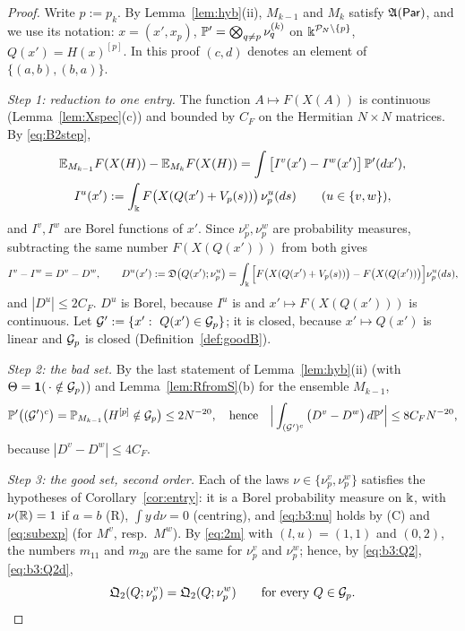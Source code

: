 \begin{proof}
Write $p:=p_k$. By Lemma~\ref{lem:hyb}(ii), $M_{k-1}$ and $M_k$ satisfy $\fA(\Par)$, and we use its notation: $x=(x',x_p)$, $\P'=\bigotimes_{q\ne p}\nu^{(k)}_q$ on $\K^{\mathcal P_N\setminus\{p\}}$, $Q(x')=H(x)^{[p]}$.
In this proof $(c,d)$ denotes an element of $\{(a,b),(b,a)\}$.

\smallskip\noindent\emph{Step 1: reduction to one entry.} The function $A\mapsto F(X(A))$ is continuous (Lemma~\ref{lem:Xspec}(c)) and bounded by $C_F$ on the Hermitian $N\times N$ matrices. By \eqref{eq:B2step},
\begin{gather*}
\E_{M_{k-1}}F(X(H))-\E_{M_k}F(X(H))=\int\big[I^v(x')-I^w(x')\big]\,\P'(dx'),\\
I^u(x'):=\int_\K F\big(X(Q(x')+V_p(s))\big)\,\nu^u_p(ds)\qquad(u\in\{v,w\}),
\end{gather*}
and $I^v,I^w$ are Borel functions of $x'$. Since $\nu^v_p,\nu^w_p$ are probability measures, subtracting the same number $F(X(Q(x')))$ from both gives
\begin{equation}\label{eq:b3:DD}
I^v-I^w=D^v-D^w,\qquad D^u(x'):=\mathfrak D\big(Q(x');\nu^u_p\big)=\int_\K\Big[F\big(X(Q(x')+V_p(s))\big)-F\big(X(Q(x'))\big)\Big]\nu^u_p(ds),
\end{equation}
and $|D^u|\le2C_F$.
$D^u$ is Borel, because $I^u$ is and $x'\mapsto F(X(Q(x')))$ is continuous. Let $\cG':=\{x':\ Q(x')\in\cG_p\}$; it is closed, because $x'\mapsto Q(x')$ is linear and $\cG_p$ is closed (Definition~\ref{def:goodB}).

\smallskip\noindent\emph{Step 2: the bad set.} By the last statement of Lemma~\ref{lem:hyb}(ii) (with $\Theta=\mathbf 1(\,\cdot\notin\cG_p)$) and Lemma~\ref{lem:RfromS}(b) for the ensemble $M_{k-1}$,
\begin{equation}\label{eq:b3:bad}
\P'\big((\cG')^c\big)=\P_{M_{k-1}}\big(H^{[p]}\notin\cG_p\big)\le2N^{-20},\quad\text{hence}\quad\Big|\int_{(\cG')^c}\big(D^v-D^w\big)\,d\P'\Big|\le8C_FN^{-20},
\end{equation}
because $|D^v-D^w|\le4C_F$.

\smallskip\noindent\emph{Step 3: the good set, second order.} Each of the laws $\nu\in\{\nu^v_p,\nu^w_p\}$ satisfies the hypotheses of Corollary~\ref{cor:entry}: it is a Borel probability measure on $\K$, with $\nu(\R)=1$ if $a=b$ (R),
$\int y\,d\nu=0$ (centring), and \eqref{eq:b3:nu} holds by (C) and \eqref{eq:subexp} (for $M^v$, resp.\ $M^w$). By \eqref{eq:2m} with $(l,u)=(1,1)$ and $(0,2)$, the numbers $m_{11}$ and $m_{20}$ are the same for $\nu^v_p$ and
$\nu^w_p$; hence, by \eqref{eq:b3:Q2}, \eqref{eq:b3:Q2d},
\begin{equation}\label{eq:b3:Q2eq}
\mathfrak Q_2(Q;\nu^v_p)=\mathfrak Q_2(Q;\nu^w_p)\qquad\text{for every }Q\in\cG_p .
\end{equation}


\end{proof}
